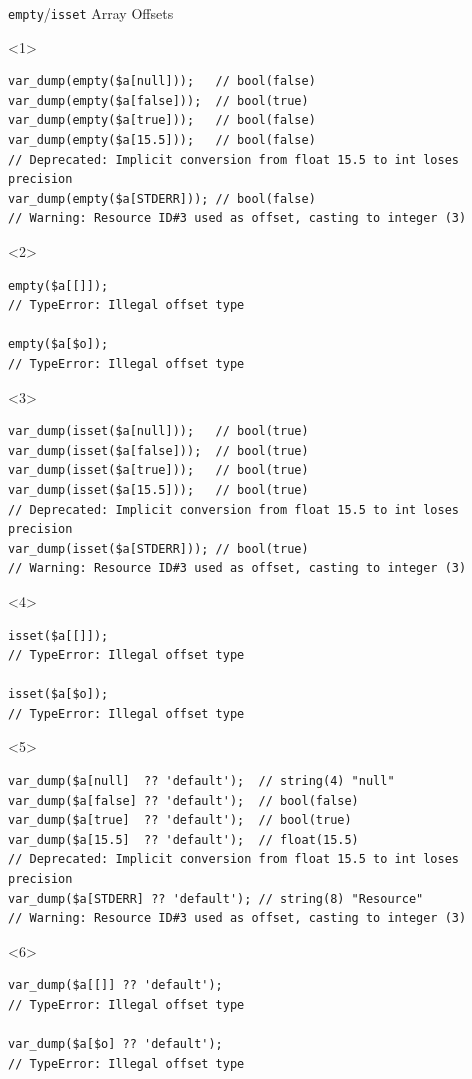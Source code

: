 \documentclass[aspectratio=169]{beamer}
\begin{document}
\begin{frame}[fragile]{\texttt{empty}/\texttt{isset} Array Offsets}
    \begin{onlyenv}<1>
        \begin{verbatim}
var_dump(empty($a[null]));   // bool(false)
var_dump(empty($a[false]));  // bool(true)
var_dump(empty($a[true]));   // bool(false)
var_dump(empty($a[15.5]));   // bool(false)
// Deprecated: Implicit conversion from float 15.5 to int loses precision
var_dump(empty($a[STDERR])); // bool(false)
// Warning: Resource ID#3 used as offset, casting to integer (3)
        \end{verbatim}
    \end{onlyenv}
    \begin{onlyenv}<2>
        \begin{verbatim}
empty($a[[]]);
// TypeError: Illegal offset type

empty($a[$o]);
// TypeError: Illegal offset type
        \end{verbatim}
    \end{onlyenv}
    \begin{onlyenv}<3>
        \begin{verbatim}
var_dump(isset($a[null]));   // bool(true)
var_dump(isset($a[false]));  // bool(true)
var_dump(isset($a[true]));   // bool(true)
var_dump(isset($a[15.5]));   // bool(true)
// Deprecated: Implicit conversion from float 15.5 to int loses precision
var_dump(isset($a[STDERR])); // bool(true)
// Warning: Resource ID#3 used as offset, casting to integer (3)
        \end{verbatim}
    \end{onlyenv}
    \begin{onlyenv}<4>
        \begin{verbatim}
isset($a[[]]);
// TypeError: Illegal offset type

isset($a[$o]);
// TypeError: Illegal offset type
        \end{verbatim}
    \end{onlyenv}
    \begin{onlyenv}<5>
        \begin{verbatim}
var_dump($a[null]  ?? 'default');  // string(4) "null"
var_dump($a[false] ?? 'default');  // bool(false)
var_dump($a[true]  ?? 'default');  // bool(true)
var_dump($a[15.5]  ?? 'default');  // float(15.5)
// Deprecated: Implicit conversion from float 15.5 to int loses precision
var_dump($a[STDERR] ?? 'default'); // string(8) "Resource"
// Warning: Resource ID#3 used as offset, casting to integer (3)
        \end{verbatim}
    \end{onlyenv}
    \begin{onlyenv}<6>
        \begin{verbatim}
var_dump($a[[]] ?? 'default');
// TypeError: Illegal offset type

var_dump($a[$o] ?? 'default');
// TypeError: Illegal offset type
        \end{verbatim}
    \end{onlyenv}
\end{frame}
\end{document}
